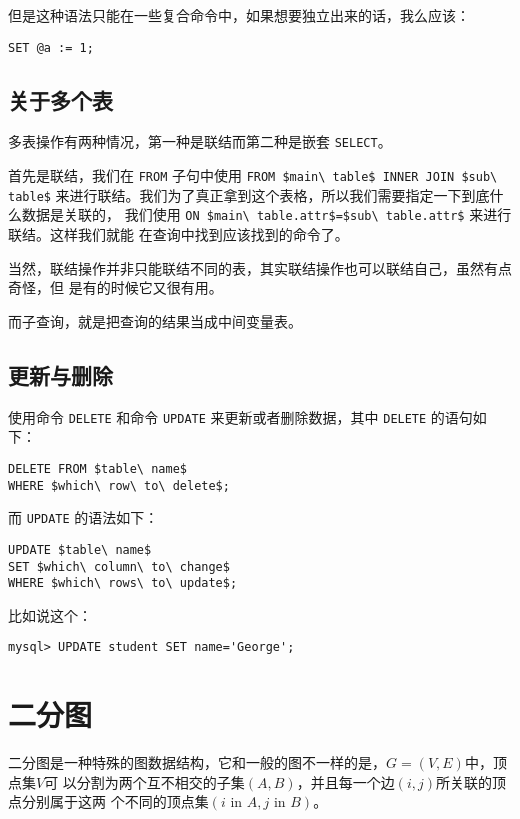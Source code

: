 但是这种语法只能在一些复合命令中，如果想要独立出来的话，我么应该：
\begin{lstlisting}
SET @a := 1;
\end{lstlisting}

\subsection{关于多个表}

多表操作有两种情况，第一种是联结而第二种是嵌套 \verb|SELECT|。

首先是联结，我们在 \verb|FROM| 子句中使用 \verb|FROM $main\ table$ INNER JOIN $sub\ table$| %
来进行联结。我们为了真正拿到这个表格，所以我们需要指定一下到底什么数据是关联的，
我们使用 \verb|ON $main\ table.attr$=$sub\ table.attr$| 来进行联结。这样我们就能
在查询中找到应该找到的命令了。

当然，联结操作并非只能联结不同的表，其实联结操作也可以联结自己，虽然有点奇怪，但
是有的时候它又很有用。

而子查询，就是把查询的结果当成中间变量表。

\subsection{更新与删除}

使用命令 \verb|DELETE| 和命令 \verb|UPDATE| 来更新或者删除数据，其中 \verb|DELETE| %
的语句如下：
\begin{lstlisting}
DELETE FROM $table\ name$
WHERE $which\ row\ to\ delete$;
\end{lstlisting}

而 \verb|UPDATE| 的语法如下：
\begin{lstlisting}
UPDATE $table\ name$
SET $which\ column\ to\ change$
WHERE $which\ rows\ to\ update$;
\end{lstlisting}

比如说这个：
\begin{lstlisting}
mysql> UPDATE student SET name='George';
\end{lstlisting}


\section{二分图}

二分图是一种特殊的图数据结构，它和一般的图不一样的是，$G=(V,E)$中，顶点集$V$可
以分割为两个互不相交的子集$(A,B)$，并且每一个边$(i,j)$所关联的顶点分别属于这两
个不同的顶点集$(i\text{ in }A, j\text{ in }B)$。

% 
